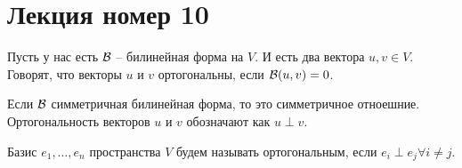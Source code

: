 \section{Лекция номер 10}
\begin{conj}
    Пусть у нас есть $\mathcal{B}$ -- билинейная форма на $V$. И есть два вектора $u, v \in V$. Говорят, что векторы 
    $u$ и $v$ ортогональны, если $\mathcal{B}(u, v) = 0$.
\end{conj}

Если $\mathcal{B}$ симметричная билинейная форма, то это симметричное отноешние.
Ортогональность векторов $u$ и $v$ обозначают как $u \perp v$.

\begin{conj}
    Базис $e_1, \dots, e_n$ пространства $V$ будем называть ортогональным, если $e_i \perp e_j \forall i \neq j$. 
\end{conj}

